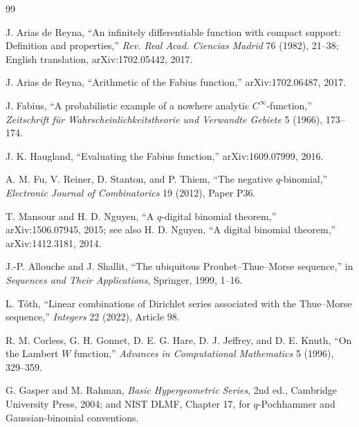 \documentclass[11pt,oneside]{article}
\numberwithin{equation}{section}
\theoremstyle{definition}
\theoremstyle{remark}
\begin{document}
\begin{thebibliography}{99}

J. Arias de Reyna,
``An infinitely differentiable function with compact support: Definition and
properties,'' \emph{Rev. Real Acad. Ciencias Madrid} 76 (1982), 21--38;
English translation, arXiv:1702.05442, 2017.

J. Arias de Reyna,
``Arithmetic of the Fabius function,'' arXiv:1702.06487, 2017.

J. Fabius,
``A probabilistic example of a nowhere analytic $C^\infty$-function,''
\emph{Zeitschrift f\"ur Wahrscheinlichkeitstheorie und Verwandte Gebiete}
5 (1966), 173--174.

J. K. Haugland,
``Evaluating the Fabius function,'' arXiv:1609.07999, 2016.

A. M. Fu, V. Reiner, D. Stanton, and P. Thiem,
``The negative $q$-binomial,''
\emph{Electronic Journal of Combinatorics} 19 (2012), Paper P36.

T. Mansour and H. D. Nguyen,
``A $q$-digital binomial theorem,'' arXiv:1506.07945, 2015; see also
H. D. Nguyen, ``A digital binomial theorem,'' arXiv:1412.3181, 2014.

J.-P. Allouche and J. Shallit,
``The ubiquitous Prouhet--Thue--Morse sequence,'' in \emph{Sequences and
Their Applications}, Springer, 1999, 1--16.

L. T\'oth,
``Linear combinations of Dirichlet series associated with the Thue--Morse
sequence,'' \emph{Integers} 22 (2022), Article 98.

R. M. Corless, G. H. Gonnet, D. E. G. Hare, D. J. Jeffrey, and D. E. Knuth,
``On the Lambert $W$ function,'' \emph{Advances in Computational
Mathematics} 5 (1996), 329--359.

G. Gasper and M. Rahman,
\emph{Basic Hypergeometric Series}, 2nd ed., Cambridge University Press,
2004; and NIST DLMF, Chapter 17, for $q$-Pochhammer and Gaussian-binomial
conventions.

\end{thebibliography}
\end{document}
